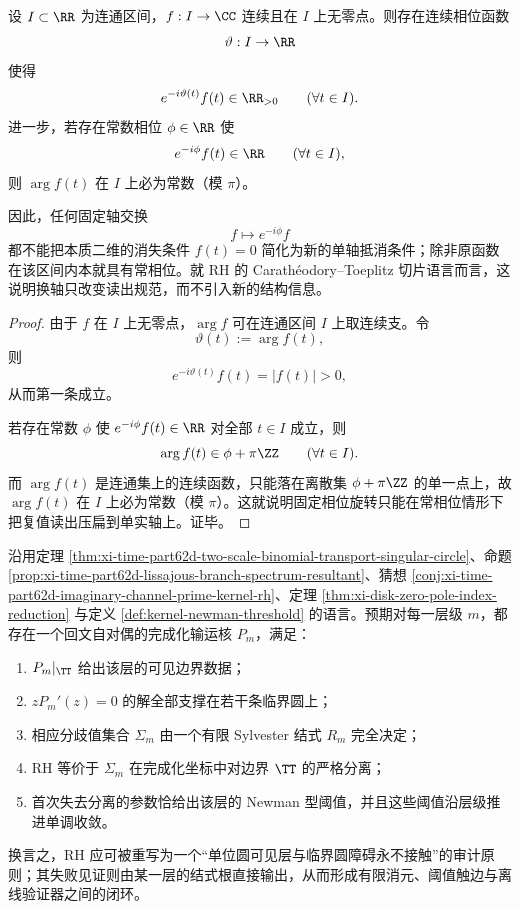 \begin{theorem}[实轴与虚轴的交换只对应切片规范而不产生新的 RH 信息]\label{thm:xi-time-part62d-axis-rotation-is-slice-gauge}
设 \(I\subset\RR\) 为连通区间，\(f:I\to\CC\) 连续且在 \(I\) 上无零点。则存在连续相位函数
\[
\vartheta:I\to\RR
\]
使得
\[
e^{-i\vartheta(t)}f(t)\in\RR_{>0}
\qquad(\forall t\in I).
\]
进一步，若存在常数相位 \(\phi\in\RR\) 使
\[
e^{-i\phi}f(t)\in\RR
\qquad(\forall t\in I),
\]
则 \(\arg f(t)\) 在 \(I\) 上必为常数（模 \(\pi\)）。

因此，任何固定轴交换
\[
f\longmapsto e^{-i\phi}f
\]
都不能把本质二维的消失条件 \(f(t)=0\) 简化为新的单轴抵消条件；除非原函数在该区间内本就具有常相位。就 RH 的 Carath\'eodory--Toeplitz 切片语言而言，这说明换轴只改变读出规范，而不引入新的结构信息。
\end{theorem}
\begin{proof}
由于 \(f\) 在 \(I\) 上无零点，\(\arg f\) 可在连通区间 \(I\) 上取连续支。令
\[
\vartheta(t):=\arg f(t),
\]
则
\[
e^{-i\vartheta(t)}f(t)=|f(t)|>0,
\]
从而第一条成立。

若存在常数 \(\phi\) 使 \(e^{-i\phi}f(t)\in\RR\) 对全部 \(t\in I\) 成立，则
\[
\arg f(t)\in \phi+\pi\ZZ
\qquad(\forall t\in I).
\]
而 \(\arg f(t)\) 是连通集上的连续函数，只能落在离散集 \(\phi+\pi\ZZ\) 的单一点上，故 \(\arg f(t)\) 在 \(I\) 上必为常数（模 \(\pi\)）。这就说明固定相位旋转只能在常相位情形下把复值读出压扁到单实轴上。证毕。
\end{proof}

\begin{conjecture}\label{conj:xi-time-part62d-singular-circle-boundary-separation-rh}
沿用定理 \ref{thm:xi-time-part62d-two-scale-binomial-transport-singular-circle}、命题 \ref{prop:xi-time-part62d-lissajous-branch-spectrum-resultant}、猜想 \ref{conj:xi-time-part62d-imaginary-channel-prime-kernel-rh}、定理 \ref{thm:xi-disk-zero-pole-index-reduction} 与定义 \ref{def:kernel-newman-threshold} 的语言。预期对每一层级 \(m\)，都存在一个回文自对偶的完成化输运核 \(P_m\)，满足：
\begin{enumerate}
  \item \(P_m|_{\TT}\) 给出该层的可见边界数据；
  \item \(zP_m'(z)=0\) 的解全部支撑在若干条临界圆上；
  \item 相应分歧值集合 \(\Sigma_m\) 由一个有限 Sylvester 结式 \(R_m\) 完全决定；
  \item RH 等价于 \(\Sigma_m\) 在完成化坐标中对边界 \(\TT\) 的严格分离；
  \item 首次失去分离的参数恰给出该层的 Newman 型阈值，并且这些阈值沿层级推进单调收敛。
\end{enumerate}
换言之，RH 应可被重写为一个“单位圆可见层与临界圆障碍永不接触”的审计原则；其失败见证则由某一层的结式根直接输出，从而形成有限消元、阈值触边与离线验证器之间的闭环。
\end{conjecture}

\endinput
